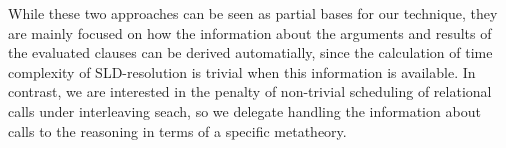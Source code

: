 While these two approaches can be seen as partial bases for our technique, they are mainly focused on how the information about the arguments and results of
the evaluated clauses can be derived automatially, since the calculation of time complexity of \textsc{SLD}-resolution is trivial when this information is available.
In contrast, we are interested in the penalty of non-trivial scheduling of relational calls under interleaving seach, so we delegate handling the information
about calls to the reasoning in terms of a specific metatheory.

